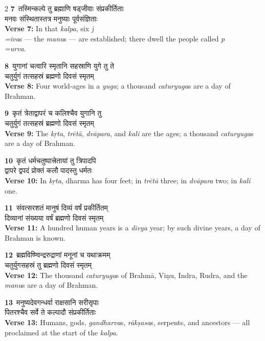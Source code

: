 \documentclass[11pt,a4paper]{article}
\newcommand{\dev}[1]{{\devanagarifont #1}}
\newcommand{\iast}[1]{\textit{#1}}
\newcommand{\vnum}[1]{\textcolor{versenumbercolor}{\textbf{#1}}}
\begin{document}
\begin{paracol}{2}
\switchcolumn[0]
\vnum{7}\ \dev{तस्मिन्कल्पे तु ब्रह्माणि षड्जीवाः संप्रकीर्तिताः}\\
\dev{मनवः संस्थितास्तत्र मनुष्याः पूर्वसंज्ञिताः}\\
\switchcolumn[1]
\textbf{Verse 7:} In that \iast{kalpa}, six \iast{j\\=iva}s --- the \iast{manu}s --- are established; there dwell the people called \iast{p\\=urva}.

\switchcolumn[0]
\vnum{8}\ \dev{युगानां चत्वारि स्मृतानि सहस्राणि युगे तु ते}\\
\dev{चतुर्युगं तत्सहस्रं ब्रह्मणो दिवसं स्मृतम्}\\
\switchcolumn[1]
\textbf{Verse 8:} Four world-ages in a \iast{yuga}; a thousand \iast{caturyuga}s are a day of Brahman.

\switchcolumn[0]
\vnum{9}\ \dev{कृतं त्रेताद्वापरं च कलिश्चैव युगानि तु}\\
\dev{चतुर्युगं तत्सहस्रं ब्रह्मणो दिवसं स्मृतम्}\\
\switchcolumn[1]
\textbf{Verse 9:} The \iast{k\d rta}, \iast{tr\=et\=a}, \iast{dv\=apara}, and \iast{kali} are the ages; a thousand \iast{caturyuga}s are a day of Brahman.

\switchcolumn[0]
\vnum{10}\ \dev{कृतं धर्मचतुष्पात्त्रेतायां तु त्रिपादपि}\\
\dev{द्वापरे द्वपदं प्रोक्तं कलौ पादस्तु धर्मतः}\\
\switchcolumn[1]
\textbf{Verse 10:} In \iast{k\d rta}, dharma has four feet; in \iast{tr\=et\=a} three; in \iast{dv\=apara} two; in \iast{kali} one.

\switchcolumn[0]
\vnum{11}\ \dev{संवत्सरशतं मानुषं दिव्यं वर्षं प्रकीर्तितम्}\\
\dev{दिव्यानां संख्यया वर्षं ब्रह्मणो दिवसं स्मृतम्}\\
\switchcolumn[1]
\textbf{Verse 11:} A hundred human years is a \iast{divya} year; by such divine years, a day of Brahman is known.

\switchcolumn[0]
\vnum{12}\ \dev{ब्रह्मविष्ण्विन्द्ररुद्राणां मनूनां च यथाक्रमम्}\\
\dev{चतुर्युगसहस्रं तु ब्रह्मणो दिवसं स्मृतम्}\\
\switchcolumn[1]
\textbf{Verse 12:} The thousand \iast{caturyuga}s of Brahm\=a, Vi\d nu, Indra, Rudra, and the \iast{manu}s are a day of Brahman.

\switchcolumn[0]
\vnum{13}\ \dev{मनुष्यदेवगन्धर्वा राक्षसानि सरीसृपाः}\\
\dev{पितरश्चैव सर्वे ते कल्पादौ संप्रकीर्तिताः}\\
\switchcolumn[1]
\textbf{Verse 13:} Humans, gods, \iast{gandharva}s, \iast{r\=ak\d sasa}s, serpents, and ancestors --- all proclaimed at the start of the \iast{kalpa}.


\end{paracol}
\end{document}
